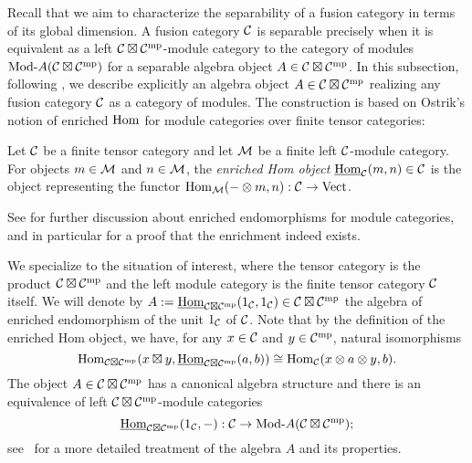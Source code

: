 \documentclass{amsart}
\begin{document}
Recall that we aim to characterize the separability of a fusion category in terms of its global dimension.  A fusion category $\mathcal C$ is separable precisely when it is equivalent as a left $\mathcal C \boxtimes \mathcal C^{\mathrm{mp}}$-module category to the category of modules $\Mod{}{A}(\cC \boxtimes \cC^\mp)$ for a separable algebra object $A \in \mathcal C \boxtimes \mathcal C^{\mathrm{mp}}$.    In this subsection, following \cite{MR2097289}, we describe explicitly an algebra object $A \in \mathcal C \boxtimes \mathcal C^{\mathrm{mp}}$ realizing any fusion category $\mathcal C$ as a category of modules.  The construction is based on Ostrik's notion of enriched $\operatorname{Hom}$ for module categories over finite tensor categories: 
\begin{definition}
Let $\mathcal C$ be a finite tensor category and let $\mathcal M$ be a finite left $\mathcal C$-module category.  For objects $m \in \mathcal M$ and $n \in \mathcal M$, the \emph{enriched Hom object} $\operatorname{\underline{Hom}}_\mathcal C(m,n) \in \mathcal C$ is the object representing the functor $\operatorname{Hom}_\mathcal M(- \otimes m,n): \mathcal C \rightarrow \mathrm{Vect}$.
\end{definition}
\nid See \cite{MR1976459, EO-ftc, EGNO, BTP} for further discussion about enriched endomorphisms for module categories, and in particular for a proof that the enrichment indeed exists.

We specialize to the situation of interest, where the tensor category is the product $\mathcal C \boxtimes \mathcal C^{\mathrm{mp}}$ and the left module category is the finite tensor category $\mathcal C$ itself.  We will denote by $A := \operatorname{\underline{Hom}}_{\mathcal C \boxtimes \mathcal C^{\mathrm{mp}}}(1_\mathcal C,1_\mathcal C) \in \mathcal C \boxtimes \mathcal C^{\mathrm{mp}}$ the algebra of enriched endomorphism of the unit $1_\mathcal C$ of $\mathcal C$.  Note that by the definition of the enriched Hom object, we have, for any $x \in \mathcal C$ and $y \in \mathcal C^{\mathrm{mp}}$, natural isomorphisms
\[
\operatorname{Hom}_{\mathcal C \boxtimes \mathcal C^{\mathrm{mp}}}(x \boxtimes y, \operatorname{\underline{Hom}}_{\mathcal C \boxtimes \mathcal C^{\mathrm{mp}}}(a,b)) \cong \operatorname{Hom}_\mathcal C(x \otimes a \otimes y,b).
\]
The object $A \in \mathcal C \boxtimes \mathcal C^{\mathrm{mp}}$ has a canonical algebra structure and there is an equivalence of left $\mathcal C \boxtimes \mathcal C^{\mathrm{mp}}$-module categories
\[
\IHom_{\cC \boxtimes \cC^\mp}(1_\cC,-) : \cC \ra \Mod{}{A}(\cC \boxtimes \cC^\mp);
\]
see~\cite[\S 2]{MR2097289} for a more detailed treatment of the algebra $A$ and its properties.   
\end{document}
